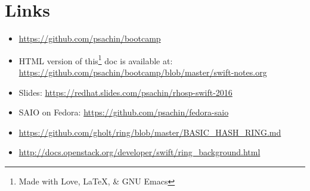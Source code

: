 \documentclass{article}
\begin{document}
\section{Links}
\label{sec:org1f9681d}
\begin{itemize}
\item \url{https://github.com/psachin/bootcamp}
\item HTML version of this\footnote[1]{Made with Love, \LaTeX, \& GNU Emacs} doc is available at: \newline
\url{https://github.com/psachin/bootcamp/blob/master/swift-notes.org}
\item Slides: \url{https://redhat.slides.com/psachin/rhosp-swift-2016}
\item SAIO on Fedora: \url{https://github.com/psachin/fedora-saio}
\item \url{https://github.com/gholt/ring/blob/master/BASIC\_HASH\_RING.md}
\item \url{http://docs.openstack.org/developer/swift/ring\_background.html}
\end{itemize}
\end{document}
